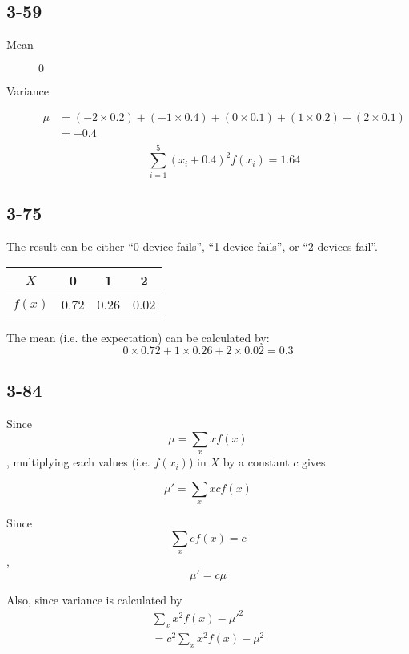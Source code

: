 \documentclass{article}
\begin{document}
\subsection*{3-59}
\begin{description}
    \item[Mean]
        $0$
    \item[Variance]
        \begin{equation*}
            \begin{aligned}
                \mu &= (-2 \times 0.2) + (-1 \times 0.4) + (0 \times 0.1) + (1 \times 0.2) + (2 \times 0.1) \\
                    &= -0.4 \\
            \end{aligned}
        \end{equation*}
        \begin{equation*}
            \sum_{i = 1}^{5} (x_i + 0.4)^2 f(x_i) = 1.64
        \end{equation*}
\end{description}
\subsection*{3-75}
The result can be either ``0 device fails'', ``1 device fails'', or ``2
devices fail''.

\begin{table}[h]
    \centering
    \begin{tabular}{|c|c|c|c|}
        \hline
        $X$ & 0 & 1 & 2 \\
        \hline
        $f(x)$ & 0.72 & 0.26 & 0.02 \\
        \hline
    \end{tabular}
\end{table}

The mean (i.e. the expectation) can be calculated by:
\[
    0 \times 0.72 + 1 \times 0.26 + 2 \times 0.02 = 0.3
\]

\subsection*{3-84}
Since
\[
    \mu = \sum_{x} xf(x)
\]
, multiplying each values (i.e. $f(x_i)$) in $X$ by a constant $c$ gives

\[
    \mu' = \sum_{x} xcf(x)
\]

Since
\[
    \sum_{x} cf(x) = c
\]
,
\[
    \mu' = c\mu
\]

Also, since variance is calculated by
\begin{equation*}
    \begin{aligned}
        \sum_{x} x^2f(x) - \mu'^2 \\
        = c^2 \sum_{x} x^2f(x) - \mu^2
    \end{aligned}
\end{equation*}
\end{document}
